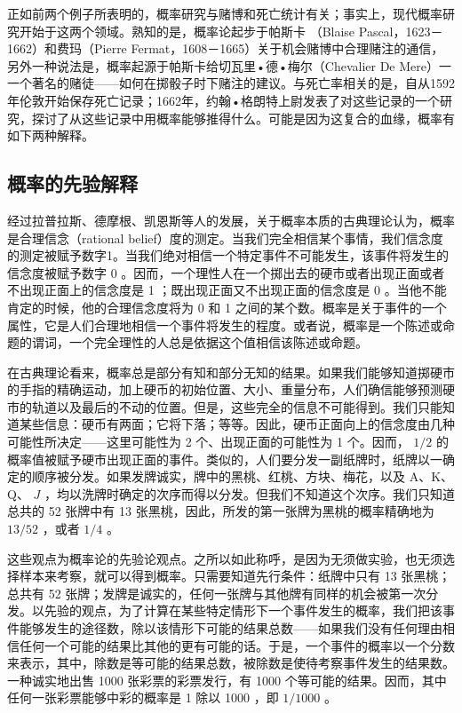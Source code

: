 正如前两个例子所表明的，概率研究与赌博和死亡统计有关；事实上，现代概率研究开始于这两个领域。熟知的是，概率论起步于帕斯卡 （Blaise Pascal，1623－1662）和费玛（Pierre Fermat，1608－1665）关于机会赌博中合理赌注的通信，另外一种说法是，概率起源于帕斯卡给切瓦里•德•梅尔（Chevalier De Mere）一一个著名的赌徒——如何在掷骰子时下赌注的建议。与死亡率相关的是，自从1592年伦敦开始保存死亡记录；1662年，约翰•格朗特上尉发表了对这些记录的一个研究，探讨了从这些记录中用概率能够推得什么。可能是因为这复合的血缘，概率有如下两种解释。

\subsection{概率的先验解释}

经过拉普拉斯、德摩根、凯恩斯等人的发展，关于概率本质的古典理论认为，概率是合理信念（rational belief）度的测定。当我们完全相信某个事情，我们信念度的测定被赋予数字1。当我们绝对相信一个特定事件不可能发生，该事件将发生的信念度被赋予数字 0 。因而，一个理性人在一个掷出去的硬市或者出现正面或者不出现正面上的信念度是 1 ；既出现正面又不出现正面的信念度是 0 。当他不能肯定的时候，他的合理信念度将为 0 和 1 之间的某个数。概率是关于事件的一个属性，它是人们合理地相信一个事件将发生的程度。或者说，概率是一个陈述或命题的谓词，一个完全理性的人总是依据这个值相信该陈述或命题。

在古典理论看来，概率总是部分有知和部分无知的结果。如果我们能够知道掷硬市的手指的精确运动，加上硬币的初始位置、大小、重量分布，人们确信能够预测硬市的轨道以及最后的不动的位置。但是，这些完全的信息不可能得到。我们只能知道某些信息：硬币有两面；它将下落；等等。因此，硬币正面向上的信念度由几种可能性所决定——这里可能性为 2 个、出现正面的可能性为 1 个。因而， $1 / 2$ 的概率值被赋予硬市出现正面的事件。类似的，人们要分发一副纸牌时，纸牌以一确定的顺序被分发。如果发牌诚实，牌中的黑桃、红桃、方块、梅花，以及 A、K、Q、 $J$ ，均以洗牌时确定的次序而得以分发。但我们不知道这个次序。我们只知道总共的 52 张牌中有 13 张黑桃，因此，所发的第一张牌为黑桃的概率精确地为 $13 / 52$ ，或者 $1 / 4$ 。

这些观点为概率论的先验论观点。之所以如此称呼，是因为无须做实验，也无须选择样本来考察，就可以得到概率。只需要知道先行条件：纸牌中只有 13 张黑桃；总共有 52 张牌；发牌是诚实的，任何一张牌与其他牌有同样的机会被第一次分发。以先验的观点，为了计算在某些特定情形下一个事件发生的概率，我们把该事件能够发生的途径数，除以该情形下可能的结果总数——如果我们没有任何理由相信任何一个可能的结果比其他的更有可能的话。于是，一个事件的概率以一个分数来表示，其中，除数是等可能的结果总数，被除数是使待考察事件发生的结果数。一种诚实地出售 1000 张彩票的彩票发行，有 1000 个等可能的结果。因而，其中任何一张彩票能够中彩的概率是 1 除以 1000 ，即 $1 / 1000$ 。

